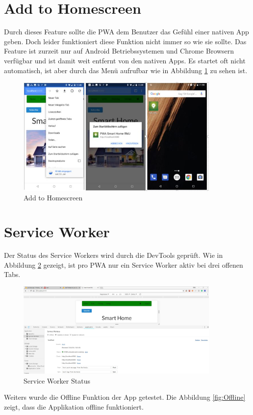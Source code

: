 \section{Add to Homescreen}
Durch dieses Feature sollte die \acs{PWA} dem Benutzer das Gefühl einer nativen App geben. Doch leider funktioniert diese Funktion nicht immer so wie sie sollte.
Das Feature ist zurzeit nur auf Android Betriebssystemen und Chrome Browsern verfügbar und ist damit weit entfernt von den nativen Apps. Es startet oft nicht automatisch, ist aber durch das Menü aufrufbar wie in Abbildung \ref{fig:ADDHome} zu sehen ist.

\begin{figure}[h]
	\centering
	\includegraphics[width=10cm]{BilderAllgemein/Test/ADDHome}\medskip
	\caption{Add to Homescreen}
	\label{fig:ADDHome}
\end{figure}
\newpage

\section{Service Worker}
Der Status des Service Workers wird durch die DevTools geprüft.
Wie in Abbildung \ref{fig:SWTest} gezeigt, ist pro \acs{PWA} nur ein Service Worker aktiv bei drei offenen Tabs. 

\begin{figure}[h]
	\centering
	\includegraphics[width=10cm]{BilderAllgemein/Test/SW}\medskip
	\caption{Service Worker Status}
	\label{fig:SWTest}
\end{figure}
Weiters wurde die Offline Funktion der App getestet.
Die Abbildung \ref{fig:Offline} zeigt, dass die Applikation offline funktioniert.

